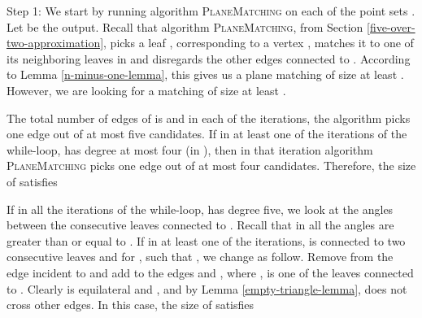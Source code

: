 \documentclass[11pt,a4paper]{article}
\begin{document}
\begin{paragraph}{Step 1:} 
We start by running algorithm {\scshape PlaneMatching} on each of the point sets . Let  be the output. Recall that algorithm {\scshape PlaneMatching}, from Section \ref{five-over-two-approximation}, picks a leaf , corresponding to a vertex , matches it to one of its neighboring leaves in  and disregards the other edges connected to . According to Lemma \ref{n-minus-one-lemma}, this gives us a plane matching  of size at least . However, we are looking for a matching of size at least . 

 The total number of edges of  is  and in each of the iterations, the algorithm picks one edge out of at most five candidates. If in at least one of the iterations of the while-loop,  has degree at most four (in ), then in that iteration algorithm {\scshape PlaneMatching} picks one edge out of at most four candidates. Therefore, the size of  satisfies 

 If in all the iterations of the while-loop,  has degree five, we look at the angles between the consecutive leaves connected to . Recall that in  all the angles are greater than or equal to . If in at least one of the iterations,  is connected to two consecutive leaves  and  for , such that , we change  as follow. Remove from  the edge incident to  and add to  the edges  and , where , is one of the leaves connected to . Clearly  is equilateral and , and by Lemma \ref{empty-triangle-lemma},  does not cross other edges. In this case, the size of  satisfies 


\end{paragraph}
\end{document}
